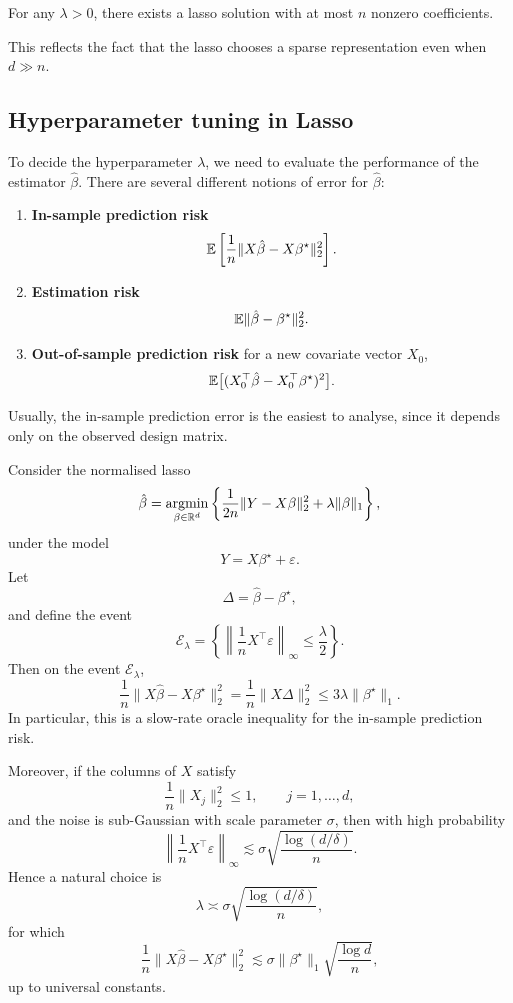 \begin{prop}
For any $\lambda>0$, there exists a lasso solution with at most $n$ nonzero coefficients.
\end{prop}

This reflects the fact that the lasso chooses a sparse representation even when $d\gg n$.

\subsection{Hyperparameter tuning in Lasso}

To decide the hyperparameter $\lambda$, we need to evaluate the performance of the estimator $\hat{\beta}$. There are several different notions of error for $\hat\beta$:
\begin{enumerate}[leftmargin=2em]
    \item \textbf{In-sample prediction risk}
    \[
    \mathbb{E}\left[\frac1n\|X\hat\beta-X\beta^\star\|_2^2\right].
    \]

    \item \textbf{Estimation risk}
    \[
    \mathbb{E}\|\hat\beta-\beta^\star\|_2^2.
    \]

    \item \textbf{Out-of-sample prediction risk}
    for a new covariate vector $X_0$,
    \[
    \mathbb{E}\bigl[(X_0^\top\hat\beta-X_0^\top\beta^\star)^2\bigr].
    \]
\end{enumerate}
Usually, the in-sample prediction error is the easiest to analyse, since it depends only on the observed design matrix. \begin{prop}
Consider the normalised lasso
\[
\hat\beta
=
\argmin_{\beta\in\R^d}
\left\{
\frac{1}{2n}\|Y-X\beta\|_2^2 + \lambda\|\beta\|_1
\right\},
\]
under the model
\[
Y=X\beta^\star+\varepsilon.
\]
Let
\[
\Delta=\hat\beta-\beta^\star,
\]
and define the event
\[
\mathcal E_\lambda
=
\left\{
\left\|\frac{1}{n}X^\top\varepsilon\right\|_\infty
\le \frac{\lambda}{2}
\right\}.
\]
Then on the event \(\mathcal E_\lambda\),
\[
\frac{1}{n}\|X\hat\beta-X\beta^\star\|_2^2
=
\frac{1}{n}\|X\Delta\|_2^2
\le
3\lambda\|\beta^\star\|_1.
\]
In particular, this is a slow-rate oracle inequality for the in-sample prediction risk.

Moreover, if the columns of \(X\) satisfy
\[
\frac{1}{n}\|X_j\|_2^2\le 1,
\qquad j=1,\dots,d,
\]
and the noise is sub-Gaussian with scale parameter \(\sigma\), then with high probability
\[
\left\|\frac{1}{n}X^\top\varepsilon\right\|_\infty
\lesssim
\sigma\sqrt{\frac{\log(d/\delta)}{n}}.
\]
Hence a natural choice is
\[
\lambda \asymp \sigma \sqrt{\frac{\log(d/\delta)}{n}},
\]
for which
\[
\frac{1}{n}\|X\hat\beta-X\beta^\star\|_2^2
\lesssim
\sigma\|\beta^\star\|_1\sqrt{\frac{\log d}{n}},
\]
up to universal constants.
\end{prop}

